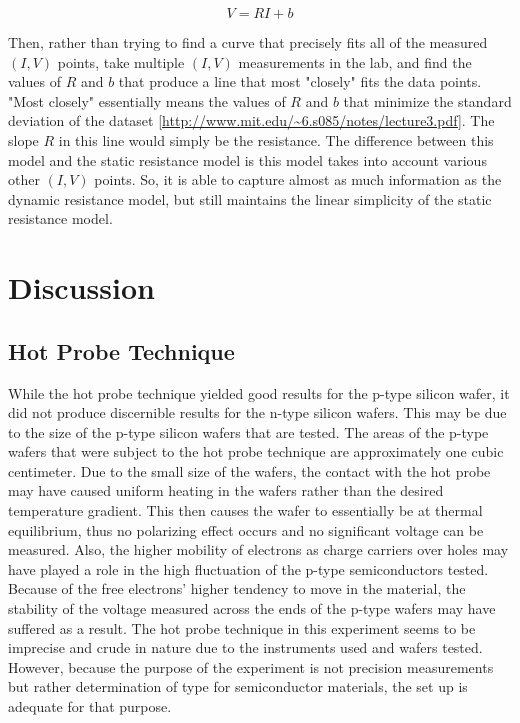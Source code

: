 \documentclass{article}
\begin{document}
\begin{equation}
\label{eq:linear_reg}
V = RI + b
\end{equation}

Then, rather than trying to find a curve that precisely fits all of the measured $(I,V)$ points, take multiple $(I,V)$ measurements in the lab, and find the values of $R$ and $b$ that produce a line that most "closely" fits the data points. "Most closely" essentially means the values of $R$ and $b$ that minimize the standard deviation of the dataset [\url{http://www.mit.edu/~6.s085/notes/lecture3.pdf}].
The slope $R$ in this line would simply be the resistance. The difference between this model and the static resistance model is this model takes into account various other $(I,V)$ points. So, it is able to capture almost as much information as the dynamic resistance model, but still maintains the linear simplicity of the static resistance model.

	
	\section{Discussion}
	\subsection{Hot Probe Technique}
	While the hot probe technique yielded good results for the p-type silicon wafer, it did not produce discernible results for the n-type silicon wafers. This may be due to the size of the p-type silicon wafers that are tested. The areas of the p-type wafers that were subject to the hot probe technique are approximately one cubic centimeter. Due to the small size of the wafers, the contact with the hot probe may have caused uniform heating in the wafers rather than the desired temperature gradient. This then causes the wafer to essentially be at thermal equilibrium, thus no polarizing effect occurs and no significant voltage can be measured. Also, the higher mobility of electrons as charge carriers over holes may have played a role in the high fluctuation of the p-type semiconductors tested. Because of the free electrons' higher tendency to move in the material, the stability of the voltage measured across the ends of the p-type wafers may have suffered as a result. The hot probe technique in this experiment seems to be imprecise and crude in nature due to the instruments used and wafers tested. However, because the purpose of the experiment is not precision measurements but rather determination of type for semiconductor materials, the set up is adequate for that purpose.
\end{document}
